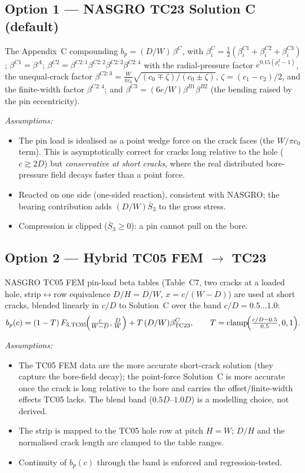 \documentclass[11pt]{article}
\newenvironment{assume}{\par\smallskip\noindent\textit{Assumptions:}\begin{itemize}[leftmargin=1.5em,topsep=2pt,itemsep=1pt]}{\end{itemize}\par\smallskip}
\begin{document}
\subsection{Option 1 --- NASGRO TC23 Solution C (default)}
The Appendix~C compounding $b_p=(D/W)\,\beta^C$, with
$\beta_i^C=\tfrac12(\beta_i^{C1}+\beta_i^{C2}+\beta_i^{C3})$; $\beta^{C1}=\beta^A$;
$\beta^{C2}=\beta^{C2{:}1}\beta^{C2{:}2}\beta^{C2{:}3}\beta^{C2{:}4}$ with the
radial-pressure factor $e^{0.15(\rho_i^2-1)}$, the unequal-crack factor
$\beta^{C2{:}3}=\tfrac{W}{\pi c_0}\sqrt{(c_0\mp\zeta)/(c_0\pm\zeta)}$,
$\zeta=(c_1-c_2)/2$, and the finite-width factor $\beta^{C2{:}4}$; and
$\beta^{C3}=(6e/W)\beta^{B1}\beta^{B2}$ (the bending raised by the pin
eccentricity).
\begin{assume}
\item The pin load is idealised as a point wedge force on the crack faces (the
  $W/\pi c_0$ term). This is asymptotically correct for cracks long relative to
  the hole ($c\gtrsim 2D$) but \emph{conservative at short cracks}, where the
  real distributed bore-pressure field decays faster than a point force.
\item Reacted on one side (one-sided reaction), consistent with NASGRO; the
  bearing contribution adds $(D/W)\bar S_3$ to the gross stress.
\item Compression is clipped ($\bar S_3\ge0$): a pin cannot pull on the bore.
\end{assume}

\subsection{Option 2 --- Hybrid TC05 FEM $\rightarrow$ TC23}
NASGRO TC05 FEM pin-load beta tables (Table~C7, two cracks at a loaded hole,
strip$\leftrightarrow$row equivalence $D/H=D/W$, $x=c/(W-D)$) are used at short
cracks, blended linearly in $c/D$ to Solution~C over the band $c/D=0.5\ldots1.0$:
\begin{equation}
b_p(c)=(1-T)\,F_{3,\text{TC05}}\!\Bigl(\tfrac{c}{W-D},\tfrac{D}{W}\Bigr)
       + T\,(D/W)\beta^C_{\text{TC23}},\qquad
T=\mathrm{clamp}\!\Bigl(\tfrac{c/D-0.5}{0.5},0,1\Bigr).
\end{equation}
\begin{assume}
\item The TC05 FEM data are the more accurate short-crack solution (they capture
  the bore-field decay); the point-force Solution~C is more accurate once the
  crack is long relative to the bore and carries the offset/finite-width effects
  TC05 lacks. The blend band ($0.5D$--$1.0D$) is a modelling choice, not derived.
\item The strip is mapped to the TC05 hole row at pitch $H=W$; $D/H$ and the
  normalised crack length are clamped to the table ranges.
\item Continuity of $b_p(c)$ through the band is enforced and regression-tested.
\end{assume}
\end{document}
